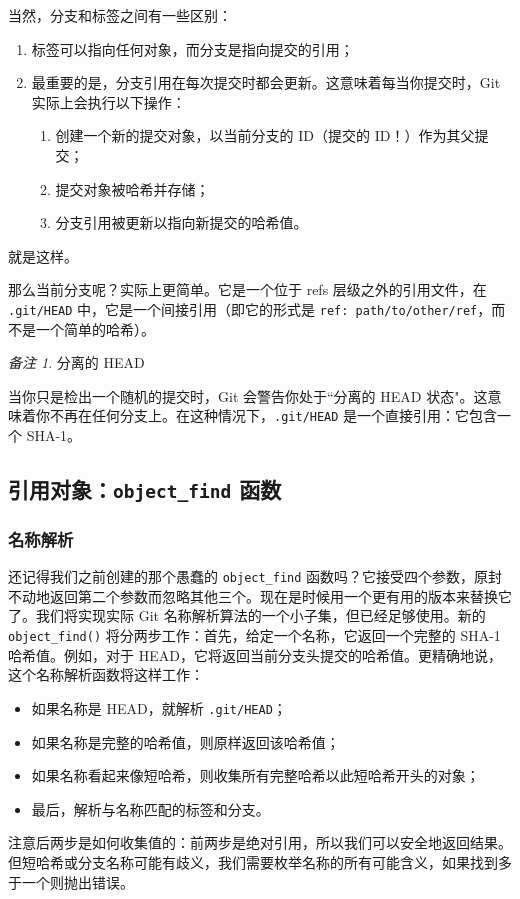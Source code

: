 \documentclass{ctexart}
\theoremstyle{remark}
\newtheorem*{remark}{备注}
\theoremstyle{warningstyle}
\theoremstyle{warningstyle}
\begin{document}
当然，分支和标签之间有一些区别：
\begin{enumerate}
    \item 标签可以指向任何对象，而分支是指向提交的引用；
    \item 最重要的是，分支引用在每次提交时都会更新。这意味着每当你提交时，Git 实际上会执行以下操作：
    \begin{enumerate}[label=\arabic*.]
        \item 创建一个新的提交对象，以当前分支的 ID（提交的 ID！）作为其父提交；
        \item 提交对象被哈希并存储；
        \item 分支引用被更新以指向新提交的哈希值。
    \end{enumerate}
\end{enumerate}
就是这样。

那么当前分支呢？实际上更简单。它是一个位于 refs 层级之外的引用文件，在 \lstinline|.git/HEAD| 中，它是一个间接引用（即它的形式是 \lstinline|ref: path/to/other/ref|，而不是一个简单的哈希）。

    \begin{remark}分离的 HEAD

    当你只是检出一个随机的提交时，Git 会警告你处于``分离的 HEAD 状态"。这意味着你不再在任何分支上。在这种情况下，\lstinline|.git/HEAD| 是一个直接引用：它包含一个 SHA-1。\end{remark}

\cprotect\subsection{引用对象：\verb|object_find| 函数}
\subsubsection{名称解析}
还记得我们之前创建的那个愚蠢的 \verb|object_find| 函数吗？它接受四个参数，原封不动地返回第二个参数而忽略其他三个。现在是时候用一个更有用的版本来替换它了。我们将实现实际 Git 名称解析算法的一个小子集，但已经足够使用。新的 \verb|object_find()| 将分两步工作：首先，给定一个名称，它返回一个完整的 SHA-1 哈希值。例如，对于 HEAD，它将返回当前分支头提交的哈希值。更精确地说，这个名称解析函数将这样工作：
\begin{itemize}
    \item 如果名称是 HEAD，就解析 \lstinline|.git/HEAD|；
    \item 如果名称是完整的哈希值，则原样返回该哈希值；
    \item 如果名称看起来像短哈希，则收集所有完整哈希以此短哈希开头的对象；
    \item 最后，解析与名称匹配的标签和分支。
\end{itemize}
注意后两步是如何收集值的：前两步是绝对引用，所以我们可以安全地返回结果。但短哈希或分支名称可能有歧义，我们需要枚举名称的所有可能含义，如果找到多于一个则抛出错误。
\end{document}
